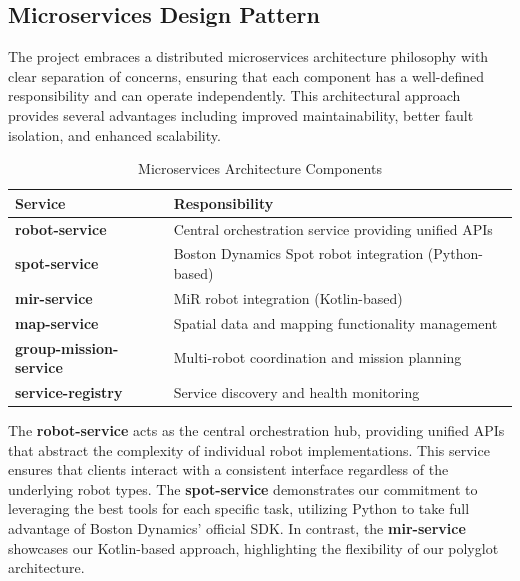\documentclass[runningheads]{llncs}
\begin{document}
\subsection{Microservices Design Pattern}

The project embraces a distributed microservices architecture philosophy with clear separation of concerns, ensuring that each component has a well-defined responsibility and can operate independently. This architectural approach provides several advantages including improved maintainability, better fault isolation, and enhanced scalability.

\begin{table}[htbp]
\centering
\begin{tabular}{@{}lp{10cm}@{}}
\toprule
\textbf{Service} & \textbf{Responsibility} \\
\midrule
\textbf{robot-service} & Central orchestration service providing unified APIs \\
\textbf{spot-service} & Boston Dynamics Spot robot integration (Python-based) \\
\textbf{mir-service} & MiR robot integration (Kotlin-based) \\
\textbf{map-service} & Spatial data and mapping functionality management \\
\textbf{group-mission-service} & Multi-robot coordination and mission planning \\
\textbf{service-registry} & Service discovery and health monitoring \\
\bottomrule
\end{tabular}
\caption{Microservices Architecture Components}
\label{tab:services}
\end{table}

The \textbf{robot-service} acts as the central orchestration hub, providing unified APIs that abstract the complexity of individual robot implementations. This service ensures that clients interact with a consistent interface regardless of the underlying robot types. The \textbf{spot-service} demonstrates our commitment to leveraging the best tools for each specific task, utilizing Python to take full advantage of Boston Dynamics' official SDK. In contrast, the \textbf{mir-service} showcases our Kotlin-based approach, highlighting the flexibility of our polyglot architecture.
\end{document}
